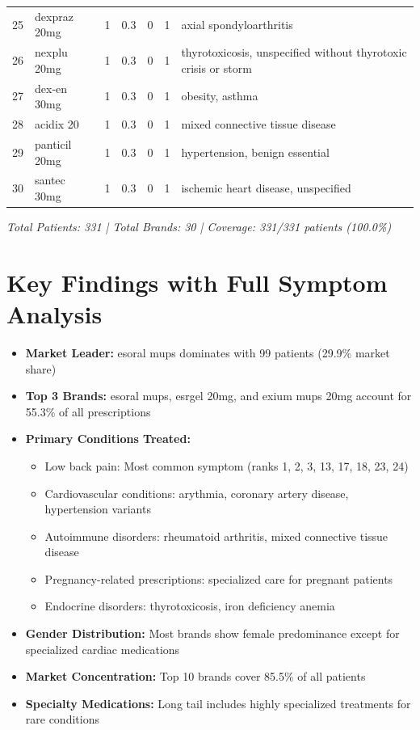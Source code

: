 \documentclass[10pt]{article}
\begin{document}
\begin{longtable}{c|l|c|c|c|c|p{5cm}}
25 & dexpraz 20mg & 1 & 0.3 & 0 & 1 & axial spondyloarthritis \\
\rowcolor{altrowcolor}
26 & nexplu 20mg & 1 & 0.3 & 0 & 1 & thyrotoxicosis, unspecified without thyrotoxic crisis or storm \\
27 & dex-en 30mg & 1 & 0.3 & 0 & 1 & obesity, asthma \\
\rowcolor{altrowcolor}
28 & acidix 20 & 1 & 0.3 & 0 & 1 & mixed connective tissue disease \\
29 & panticil 20mg & 1 & 0.3 & 0 & 1 & hypertension, benign essential \\
\rowcolor{altrowcolor}
30 & santec 30mg & 1 & 0.3 & 0 & 1 & ischemic heart disease, unspecified \\

\end{longtable}

\vspace{1cm}

\textit{Total Patients: 331 | Total Brands: 30 | Coverage: 331/331 patients (100.0\%)}

\section{Key Findings with Full Symptom Analysis}

\begin{itemize}
\item \textbf{Market Leader:} esoral mups dominates with 99 patients (29.9\% market share)
\item \textbf{Top 3 Brands:} esoral mups, esrgel 20mg, and exium mups 20mg account for 55.3\% of all prescriptions
\item \textbf{Primary Conditions Treated:}
  \begin{itemize}
    \item Low back pain: Most common symptom (ranks 1, 2, 3, 13, 17, 18, 23, 24)
    \item Cardiovascular conditions: arythmia, coronary artery disease, hypertension variants
    \item Autoimmune disorders: rheumatoid arthritis, mixed connective tissue disease
    \item Pregnancy-related prescriptions: specialized care for pregnant patients
    \item Endocrine disorders: thyrotoxicosis, iron deficiency anemia
  \end{itemize}
\item \textbf{Gender Distribution:} Most brands show female predominance except for specialized cardiac medications
\item \textbf{Market Concentration:} Top 10 brands cover 85.5\% of all patients
\item \textbf{Specialty Medications:} Long tail includes highly specialized treatments for rare conditions
\end{itemize}
\end{document}
